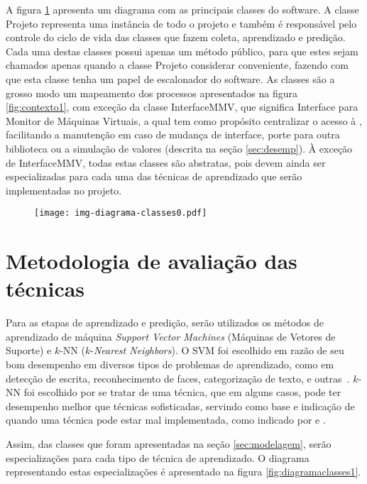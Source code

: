 
A figura \ref{fig:diagramaclasses0} apresenta um diagrama com as
principais classes do software. A classe Projeto representa uma
instância de todo o projeto e também é responsável pelo controle do ciclo
de vida das classes que fazem coleta, aprendizado e predição. Cada uma
destas classes possui apenas um método público, para que estes sejam
chamados apenas quando a classe Projeto considerar conveniente,
fazendo com que esta classe tenha um papel de escalonador do
software. As classes são a grosso modo um mapeamento dos processos
apresentados na figura \ref{fig:contexto1}, com exceção da classe
InterfaceMMV, que significa Interface para Monitor de
Máquinas Virtuais, a qual tem como propósito centralizar o acesso à \libvirt{},
facilitando a manutenção em caso de mudança de interface, porte para outra
biblioteca ou a simulação de valores (descrita na seção
\ref{sec:desemp}). À exceção de InterfaceMMV, todas estas
classes são abstratas, pois devem ainda ser especializadas para cada uma
das técnicas de aprendizado que serão implementadas no projeto.

\begin{figure}[htp]
\centering
\texttt{[image: img-diagrama-classes0.pdf]}
\label{fig:diagramaclasses0}
\end{figure}


\section{Metodologia de avaliação das técnicas}

Para as etapas de aprendizado e predição, serão utilizados os métodos de
aprendizado de máquina \emph{Support Vector Machines} (Máquinas de Vetores
de Suporte) e $k$-NN ($k$-\emph{Nearest Neighbors}). O SVM foi escolhido em
razão de seu bom desempenho em diversos tipos de problemas de aprendizado,
como em detecção de escrita, reconhecimento de faces, categorização de
texto, e outras~\cite{bennett2000support}. $k$-NN foi escolhido por se
tratar de uma técnica, que em alguns casos, pode ter desempenho melhor que
técnicas sofisticadas, servindo como base e indicação de quando uma técnica
pode estar mal implementada, como indicado por
 e .

Assim, das classes que foram apresentadas na seção \ref{sec:modelagem},
serão especializações para cada tipo de técnica de aprendizado. O diagrama
representando estas especializações é apresentado na figura
\ref{fig:diagramaclasses1}.

